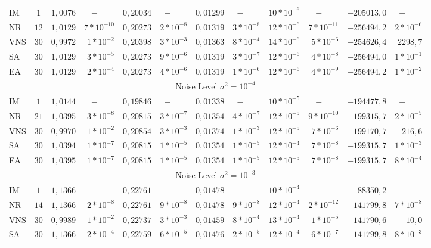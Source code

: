 \documentclass{sig-alternate}
\begin{document}
\begin{table*}
\begin{center}
{\begin{tabular}{lc|rrrrrrrrrr}
\hline
IM 		& $1$ 	&$1,0076$&$-\qquad$      	    & $0,20034$&$-\qquad$      	&$0,01299$&$-\qquad$    	    &$10*10^{-6}$&$-\qquad$	&$-205013,0$	&$-\qquad$\\
NR		& $12$	&$1,0129$ & $7*10^{-10}$	& $0,20273$&$2*10^{-8}$	&$0,01319$ &$3*10^{-8}$	&$12*10^{-6}$&$7*10^{-11}$	&$-256494,2$	&$2*10^{-6}$	 \\
VNS  	& $30$  &$0,9972$&$1*10^{-2}$    & $0,20398$&$3*10^{-3}$  	&$0,01363$&$8*10^{-4}$  	&$14*10^{-6}$&$5*10^{-6}$	&$-254626,4$	&$2298,7$	 \\
SA 		& $30$  &$1,0129$&$3*10^{-5}$ 	& $0,20273$&$9*10^{-6}$  	&$0,01319$&$3*10^{-7}$ 	&$12*10^{-6}$&$4*10^{-8}$	&$-256494,0$	&$1*10^{-1}$	 \\
EA 		& $30$  &$1,0129$&$2*10^{-4}$		& $0,20273$&$4*10^{-6}$  	&$0,01319$&$1*10^{-6}$ 	&$12*10^{-6}$&$4*10^{-9}$	&$-256494,2$	&$1*10^{-2}$\\
\hline
\multicolumn{12}{c}{Noise Level $\sigma^2=10^{-4}$} \\
\hline
IM 		&$1$	&$1,0144$&$-\qquad$           & $0,19846$&$-\qquad$         &$0,01338$&$-\qquad$      &$10*10^{-5}$&$-\qquad$	& $-194477,8$&$-\qquad$			 \\
NR 	&$21$	&$1,0395$&$3*10^{-8}$     &  $0,20815$&$3*10^{-7}$  &$0,01354$&$4*10^{-7}$  &$12*10^{-5}$&$9*10^{-10}$	& $-199315,7$&$2*10^{-5}$\\
VNS		&$30$	&$0,9970$&$1*10^{-2}$     & $0,20854$&$3*10^{-3}$   &$0,01374$&$1*10^{-3}$  &$12*10^{-5}$&$7*10^{-6}$	& $-199170,7$&$216,6$\\
SA 		&$30$	&$1,0394$&$1*10^{-7}$     & $0,20815$&$1*10^{-5}$   &$0,01354$&$1*10^{-5}$	&$12*10^{-4}$&$7*10^{-8}$	& $-199315,7$&$1*10^{-3}$\\
EA 		&$30$	&$1,0395$&$1*10^{-7}$     & $0,20815$&$1*10^{-5}$   &$0,01354 $&$1*10^{-5}$ &$12*10^{-5}$&$7*10^{-8}$	& $-199315,7$&$8*10^{-4}$\\
\hline
\multicolumn{12}{c}{Noise Level $\sigma^2=10^{-3}$} \\
\hline
IM 		&$1$ 	&$1,1366$	&$-\qquad$    	&$0,22761$	&$-\qquad$    	&$0,01478$	&$-\qquad$    	&$10*10^{-4}$&$-\qquad$	& $-88350,2$	&$-\qquad$\\
NR 	&$14$	&$1,1366$	&$2*10^{-8}$	&$0,22761$	&$9*10^{-8}$	&$0,01478$	&$9*10^{-8}$ 	&$12*10^{-4}$&$2*10^{-12}$	& $-141799,8 $	&$7*10^{-8}$\\
VNS 	&$30$	&$0,9989$	&$1*10^{-2}$	&$0,22737$	&$3*10^{-3}$	&$0,01459$	&$8*10^{-4}$	&$13*10^{-4}$&$1*10^{-5}$	& $-141790,6$	&$10,0$\\
SA 		&$30$	&$1,1366$	&$2*10^{-4}$	&$0,22759$	&$6*10^{-5}$	&$0,01476$	&$2*10^{-5}$ 	&$12*10^{-4}$&$6*10^{-7}$	& $-141799,8 $&$8*10^{-3}$\\

\end{tabular}}
\end{center}
\end{table*}
\end{document}

